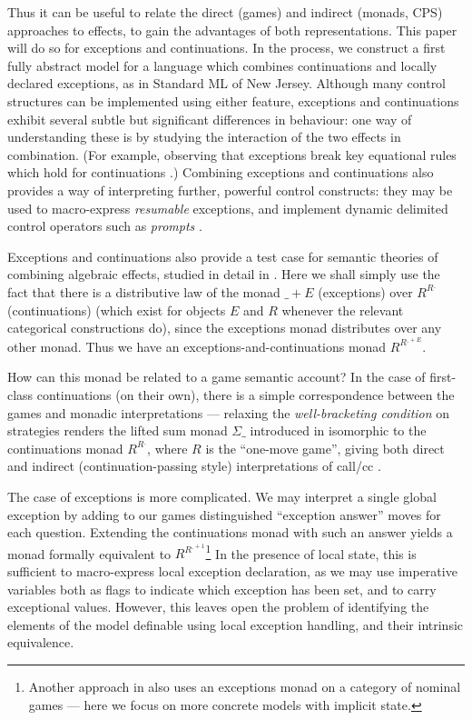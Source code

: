 \documentclass{eptcs}
\def\1m{\iota}
\def\1{1}
\newcommand{\R}{{{R}}}
\begin{document}
Thus it can be useful to relate the direct (games) and indirect (monads, CPS) approaches to effects, to gain the advantages of both representations. This paper will do so for exceptions and continuations. In the process, we construct a first fully abstract model for a language which combines continuations and locally declared exceptions, as in Standard ML of New Jersey. Although many control structures can be implemented using either feature, exceptions and continuations exhibit several subtle but significant differences in behaviour: one way of understanding these is by studying the interaction of the two effects in combination. (For example, observing that exceptions break key equational rules which hold for continuations \cite{LE}.) 
Combining exceptions and continuations also provides a way of interpreting further, powerful control constructs: they may be used to macro-express \emph{resumable} exceptions, and implement dynamic delimited control operators such as \emph{prompts} \cite{GRR}.


Exceptions and continuations also provide a test case for semantic theories of  combining  algebraic effects,  studied in detail in \cite{HLPP}. Here we shall simply use the fact that  there is a distributive law of the monad $\_ + E$ (exceptions) over  $\R^{\R^{\_}}$ (continuations)  (which exist for objects  $E$ and $\R$ whenever the relevant categorical constructions do), since the exceptions monad  distributes over any other monad.  Thus we have an exceptions-and-continuations monad $\R^{\R^{\_ +E}}$.  



How can this monad  be related to a game semantic account?  In the case of  first-class continuations (on their own), there is a simple correspondence between the games and monadic interpretations --- relaxing the \emph{well-bracketing condition} on strategies renders  the lifted sum  monad $\Sigma\_$ introduced in \cite{AMV}  isomorphic to the continuations monad $\R^{\R^\_}$, where $\R$ is the  ``one-move game'', giving both direct and indirect (continuation-passing style) interpretations of  call/cc \cite {LT}. 

 
 

The case of exceptions is more complicated.  We may interpret a single global exception by adding to our games distinguished ``exception answer'' moves for each question. Extending the continuations monad with such an answer yields a monad formally equivalent to $\R^{\R^{\_ + \1}}$\footnote{Another approach in \cite{ntex} also uses an exceptions monad on a category of nominal games --- here we focus on more concrete models with implicit state.} In the presence of local state, this is sufficient to macro-express  local exception declaration, as we may use imperative variables both as flags to indicate which exception has been set, and to carry exceptional values. However, this leaves open the problem of identifying the elements of the model definable using local exception handling, and their intrinsic equivalence.  
 
\end{document}
